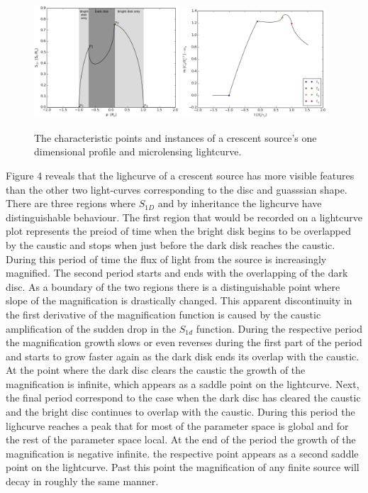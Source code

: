 \begin{figure}
\centering
	\includegraphics[width = 0.48\textwidth]{plots/ch_points.eps}
        \includegraphics[width = 0.48\textwidth]{plots/ch_instances.eps}
\caption{\label{fig:char_points} The characteristic points and instances of a crescent source's one dimensional profile and microlensing lightcurve. }
\end{figure}


Figure 4 reveals that the lighcurve of a crescent source has more visible features than the other two light-curves
corresponding to the disc and guasssian shape. There are three regions where $S_{1D}$ and by inheritance the lighcurve
 have distinguishable behaviour. The first region that would be recorded on a lightcurve plot represents the preiod
of time when the bright disk begins to be overlapped by the caustic and stops when just before the dark disk reaches
the caustic. During this period of time the flux of light from the source is increasingly magnified. The second
period starts and ends with the overlapping of the dark disc. As a boundary of the two regions there is a
distinguishable point where slope of the magnification is drastically changed. This apparent discontinuity in the
first derivative of the magnification function is caused by the caustic amplification of the sudden drop in the $S_{1d}$
function. During the respective period the magnification growth slows or even reverses during the first part of the
period and starts to grow faster again as the dark disk ends its overlap with the caustic. At the point where
the dark disc clears the caustic the growth of the magnification is infinite, which appears as a saddle point
on the lightcurve. Next, the final period correspond to the case when the dark disc has cleared the caustic
and the bright disc continues to overlap with the caustic. During this period the lighcurve reaches a peak
that for most of the parameter space is global and for the rest of the parameter space local.
At the end of the period the growth of the magnification is negative infinite. the respective point appears 
as a second saddle point on the lightcurve. Past this point the magnification of any finite source will 
decay in roughly the same manner. \\

